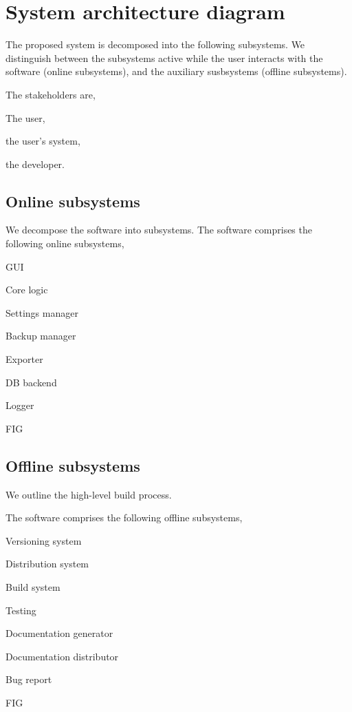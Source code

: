 \section{System architecture diagram}
The proposed system is decomposed into the following subsystems. We distinguish
between the subsystems active while the user interacts with the software (online
subsystems), and the auxiliary susbsystems (offline subsystems).

The stakeholders are,
\begin{compactitem}
\item The user,
\item the user's system,
\item the developer.
\end{compactitem}

\subsection{Online subsystems}
We decompose the software into subsystems.
The software comprises the following online subsystems,
\begin{compactitem}
\item GUI
\item Core logic
\item Settings manager
\item Backup manager
\item Exporter
\item DB backend
\item Logger
\end{compactitem}

FIG

\subsection{Offline subsystems}
We outline the high-level build process.

The software comprises the following offline subsystems,
\begin{compactitem}
\item Versioning system
\item Distribution system
\item Build system
\item Testing
\item Documentation generator
\item Documentation distributor
\item Bug report
\end{compactitem}

FIG